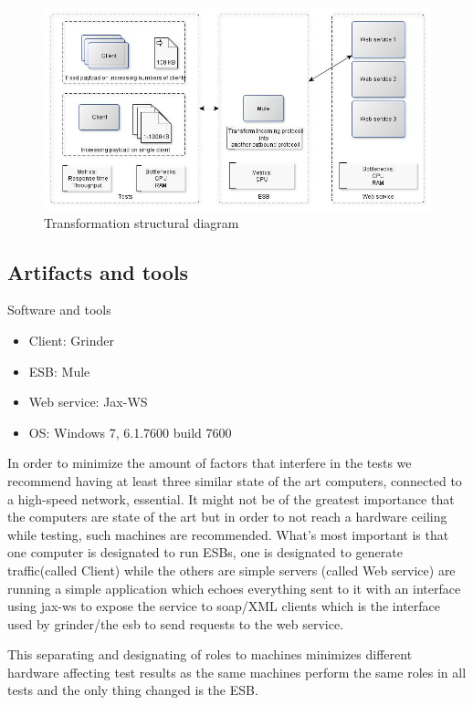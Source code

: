 \begin{figure}[H]
	\centerline{\includegraphics[scale=0.43]{img/transformation}}
	\caption{Transformation structural diagram}
	\label{fig:transform-diagram}
\end{figure}

\subsection{Artifacts and tools}
\begin{table}[H]
	\label{table:sw-spec}
	\caption{Software and tools}
	\begin{itemize}
		\item Client: Grinder \cite{whatisgrinder}
		\item ESB: Mule \cite{whatismule}
		\item Web service: Jax-WS \cite{whatisjaxws}
		\item OS: Windows 7, 6.1.7600 build 7600
	\end{itemize}
\end{table}
In order to minimize the amount of factors that interfere in the tests we recommend having at least three similar state of the art computers, connected to a high-speed network, essential.
It might not be of the greatest importance that the computers are state of the art but in order to not reach a hardware ceiling while testing, such machines are recommended. 
What's most important is that one computer is designated to run ESBs, one is designated to generate traffic(called Client) while the others are simple servers (called Web service) are running a simple application which echoes everything sent to it with an interface using jax-ws to expose the service to soap/XML clients which is the interface used by grinder/the esb to send requests to the web service.

This separating and designating of roles to machines minimizes different hardware affecting test results as the same machines perform the same roles in all tests and the only thing changed is the ESB. 

